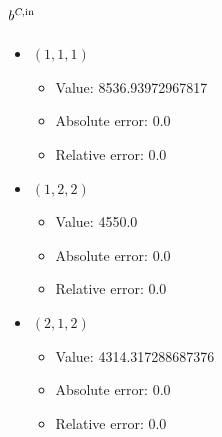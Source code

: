 \documentclass{article}%
\begin{document}
\subsection{$b^{\textsl{C},\text{in}}$}%
\begin{itemize}%
	\item $(1, 1, 1)$%
	\begin{itemize}%
		\item Value: 8536.93972967817%
		\item Absolute error: 0.0%
		\item Relative error: 0.0%
	\end{itemize}%
	\item $(1, 2, 2)$%
	\begin{itemize}%
		\item Value: 4550.0%
		\item Absolute error: 0.0%
		\item Relative error: 0.0%
	\end{itemize}%
	\item $(2, 1, 2)$%
	\begin{itemize}%
		\item Value: 4314.317288687376%
		\item Absolute error: 0.0%
		\item Relative error: 0.0%
	\end{itemize}%
\end{itemize}%
\end{document}
